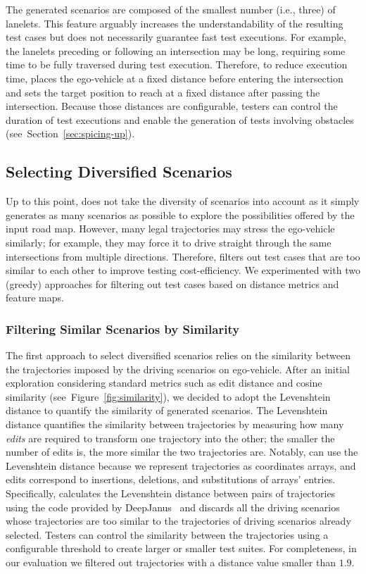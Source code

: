 \documentclass[conference]{IEEEtran}
\begin{document}
The generated scenarios are composed of the smallest number (i.e., three) of lanelets. This feature arguably increases the understandability of the resulting test cases but does not necessarily guarantee fast test executions. For example, the lanelets preceding or following an intersection may be long, requiring some time to be fully traversed during test execution. Therefore, to reduce execution time, \tool places the ego-vehicle at a fixed distance before entering the intersection and sets the target position to reach at a fixed distance after passing the intersection. Because those distances are configurable, testers can control the duration of test executions and enable the generation of tests involving obstacles (see~Section~\ref{sec:spicing-up}).


\subsection{Selecting Diversified Scenarios}
Up to this point, \tool does not take the diversity of scenarios into account as it simply generates as many scenarios as possible to explore the possibilities offered by the input road map. However, many legal trajectories may stress the ego-vehicle similarly; for example, they may force it to drive straight through the same intersections from multiple directions. Therefore, \tool filters out test cases that are too similar to each other to improve testing cost-efficiency.
%
We experimented with two (greedy) approaches for filtering out test cases based on distance metrics and feature maps.

\subsubsection{Filtering Similar Scenarios by Similarity}
The first approach to select diversified scenarios relies on the similarity between the trajectories imposed by the driving scenarios on ego-vehicle. After an initial exploration considering standard metrics such as edit distance and cosine similarity (see~Figure~\ref{fig:similarity}), we decided to adopt the Levenshtein distance to quantify the similarity of generated scenarios. The Levenshtein distance quantifies the similarity between trajectories by measuring how many \emph{edits} are required to transform one trajectory into the other; the smaller the number of edits is, the more similar the two trajectories are. Notably, \tool can use the Levenshtein distance because we represent trajectories as coordinates arrays, and edits correspond to insertions, deletions, and substitutions of arrays' entries. Specifically, \tool calculates the Levenshtein distance between pairs of trajectories using the code provided by DeepJanus~\cite{DBLP:conf/sigsoft/RiccioT20} and discards all the driving scenarios whose trajectories are too similar to the trajectories of driving scenarios already selected. 
%
Testers can control the similarity between the trajectories using a configurable threshold to create larger or smaller test suites. For completeness, in our evaluation we filtered out trajectories with a distance value smaller than $1.9$.
\end{document}
